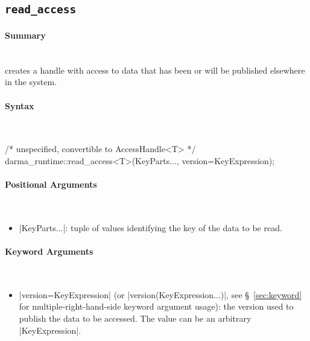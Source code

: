 \subsection{\texttt{read\_access}}
\label{ssec:api_fe_read_access}

\paragraph{Summary}\mbox{}\\
 creates a \gls{handle} with  access to data that has been or will be
published elsewhere in the system.


\paragraph{Syntax}\mbox{}\\
\begin{CppCode}
/* unspecified, convertible to AccessHandle<T> */
darma_runtime::read_access<T>(KeyParts..., version=KeyExpression);
\end{CppCode}


\paragraph{Positional Arguments}\mbox{}\\
\begin{itemize}
  \item |KeyParts...|: tuple of values identifying the key of the data to
  be read.
\end{itemize}

\paragraph{Keyword Arguments}\mbox{}\\
\begin{itemize}
  \item |version=KeyExpression| (or |version(KeyExpression...)|,
see \S~\ref{sec:keyword} for multiple-right-hand-side keyword argument usage):
the version used to publish the data to be accessed.
The value can be an arbitrary |KeyExpression|.
\end{itemize}


